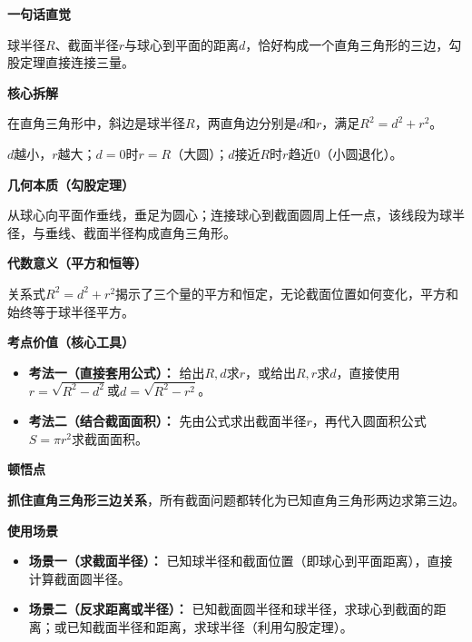 \begin{explanationbox}
	\textbf{\textcolor{CExplanation}{一句话直觉}}

	球半径$R$、截面半径$r$与球心到平面的距离$d$，恰好构成一个直角三角形的三边，勾股定理直接连接三量。

	\medskip
	\textbf{\textcolor{CExplanation}{核心拆解}}
	\begin{description}[style=nextline, leftmargin=2.8em, labelsep=0.5em, itemsep=0.45em]
		\item[\textbf{要点一（勾股三边关系）：}] 在直角三角形中，斜边是球半径$R$，两直角边分别是$d$和$r$，满足$R^{2}=d^{2}+r^{2}$。
		\item[\textbf{要点二（距离决定大小）：}] $d$越小，$r$越大；$d=0$时$r=R$（大圆）；$d$接近$R$时$r$趋近$0$（小圆退化）。
	\end{description}

	\medskip
	\textbf{\textcolor{CExplanation}{几何本质（勾股定理）}}

	从球心向平面作垂线，垂足为圆心；连接球心到截面圆周上任一点，该线段为球半径，与垂线、截面半径构成直角三角形。

	\medskip
	\textbf{\textcolor{CExplanation}{代数意义（平方和恒等）}}

	关系式$R^{2}=d^{2}+r^{2}$揭示了三个量的平方和恒定，无论截面位置如何变化，平方和始终等于球半径平方。

	\medskip
	\textbf{\textcolor{CExplanation}{考点价值（核心工具）}}
	\begin{itemize}[leftmargin=*, itemsep=0.5em, topsep=0.4em]
		\item \textbf{考法一（直接套用公式）：} 给出$R,d$求$r$，或给出$R,r$求$d$，直接使用$r=\sqrt{R^{2}-d^{2}}$或$d=\sqrt{R^{2}-r^{2}}$。
		\item \textbf{考法二（结合截面面积）：} 先由公式求出截面半径$r$，再代入圆面积公式$S=\pi r^{2}$求截面面积。
	\end{itemize}

	\medskip
	\textbf{\textcolor{CExplanation}{顿悟点}}

	\textbf{抓住直角三角形三边关系}，所有截面问题都转化为已知直角三角形两边求第三边。

	\medskip
	\textbf{\textcolor{CExplanation}{使用场景}}
	\begin{itemize}[leftmargin=*, itemsep=0.5em, topsep=0.4em]
		\item \textbf{场景一（求截面半径）：} 已知球半径和截面位置（即球心到平面距离），直接计算截面圆半径。
		\item \textbf{场景二（反求距离或半径）：} 已知截面圆半径和球半径，求球心到截面的距离；或已知截面半径和距离，求球半径（利用勾股定理）。
	\end{itemize}
\end{explanationbox}
